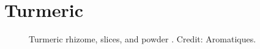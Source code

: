 \section{Turmeric}
\label{sec:turmeric}



\begin{figure}[!ht]
	\vspace{-4ex}
	\centering
	\hfill
	\hfill
	\caption[Turmeric in various forms.]{Turmeric rhizome, slices, and powder . Credit: Aromatiques.}
	\label{fig:turmeric_imgs}
\end{figure}

